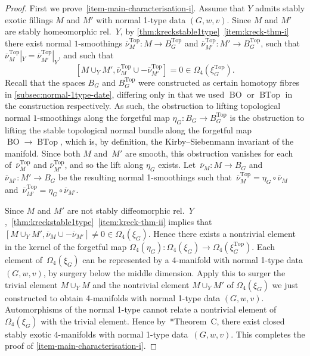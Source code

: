 \documentclass[a4paper, reqno]{amsart}
\theoremstyle{definition}
\theoremstyle{remark}
\renewcommand{\top}{\mathrm{Top}}
\newcommand{\ol}{\overline}
\DeclareMathOperator{\BTop}{BTop}
\DeclareMathOperator{\BO}{BO}
\begin{document}
\begin{proof}
First we prove~\eqref{item-main-characterisation-i}. 
Assume that $Y$ admits stably exotic fillings $M$ and $M'$ with normal 1-type data $(G,w,v)$. 
Since $M$ and $M'$ are stably homeomorphic rel.\ $Y$, by \cref{thm:kreckstable1type}~\eqref{item:kreck-thm-i} there exist normal $1$-smoothings $\ol{\nu}^{\top}_M\colon M\to B^{\top}_G$ and $\ol{\nu}^{\top}_{M'}\colon M'\to B^{\top}_G$, such that  $\ol{\nu}^{\top}_M|_Y = \ol{\nu}^{\top}_{M'}|_Y$, and such that 
\[
[M\cup_Y M', \ol{\nu}^{\top}_M \cup - \ol{\nu}^{\top}_{M'}] = 0\in \Omega_4(\xi^{\top}_G).
\] 
Recall that the spaces $B_G$ and $B_G^{\top}$ were constructed as certain homotopy fibres in \cref{subsec:normal-1type-date}, differing only in that we used $\BO$ or $\BTop$ in the construction respectively. As such, the obstruction to lifting topological normal $1$-smoothings along the forgetful map $\eta_G\colon B_G\to B_G^{\top}$ is the obstruction to lifting the stable topological normal bundle along the forgetful map $\BO\to\BTop$, which is, by definition, the Kirby--Siebenmann invariant of the manifold. Since both $M$ and~$M'$ are smooth, this obstruction vanishes for each of~$\ol{\nu}^{\top}_M$ and $\ol{\nu}^{\top}_{M'}$, and so the lift along $\eta_G$ exists.
Let~$\ol{\nu}_M\colon M\to B_G$ and $\ol{\nu}_{M'}\colon M'\to B_G$ be the resulting normal 1-smoothings  such that~$\ol{\nu}^{\top}_M=\eta_G\circ \ol{\nu}_M$ and~$\ol{\nu}^{\top}_{M'}=\eta_G\circ \ol{\nu}_{M'}$.

Since $M$ and $M'$ are not stably diffeomorphic rel.\ $Y$,~\cref{thm:kreckstable1type}~\eqref{item:kreck-thm-ii} implies that $[M\cup_Y M', \ol{\nu}_M \cup - \ol{\nu}_{M'}]\neq 0\in\Omega_4(\xi_G)$. Hence there exists a nontrivial element in the kernel of the forgetful map $\Omega_4(\eta_G)\colon \Omega_4(\xi_G)\to\Omega_4(\xi^{\top}_G)$. 
Each element of~$\Omega_4(\xi_G)$ can be represented by a 4-manifold with normal 1-type data $(G,w,v)$, by surgery below the middle dimension.  Apply this to surger the trivial element $M \cup_Y M$ and  the nontrivial element $M \cup_Y M'$ of $\Omega_4(\xi_G)$ we just constructed to obtain 4-manifolds  with normal 1-type data $(G,w,v)$.
Automorphisms of the normal 1-type cannot relate a nontrivial element of $\Omega_4(\xi_G)$ with the trivial element. Hence by~\cite{surgeryandduality}*{Theorem~C}, there exist closed stably exotic $4$-manifolds with normal 1-type data~$(G,w,v)$. 
This completes the proof of \eqref{item-main-characterisation-i}.


\end{proof}
\end{document}
